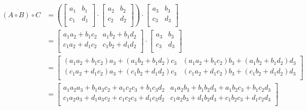 \documentclass[12pt]{article}
\begin{document}
\begin{align*}
    (A \circ B) \circ C &= 
        \left(
            \begin{bmatrix}
                a_1 & b_1 \\
                c_1 & d_1 \\               
            \end{bmatrix}
            \cdot
            \begin{bmatrix}
                a_2 & b_2 \\
                c_2 & d_2 \\
            \end{bmatrix}
        \right)
        \cdot
        \begin{bmatrix}
            a_3 & b_3 \\
            c_3 & d_3 \\
        \end{bmatrix}
        \\[1em]
        & =
        \begin{bmatrix}
            a_1a_2 + b_1c_2 & a_1b_2 + b_1d_2 \\ 
            c_1a_2 + d_1c_2 & c_1b_2 + d_1d_2 \\
        \end{bmatrix}
        \cdot
        \begin{bmatrix}
            a_3 & b_3 \\
            c_3 & d_3 \\
        \end{bmatrix}
        \\[1em]
        & = 
        \begin{bmatrix}
            (a_1a_2 + b_1c_2)a_3 + (a_1b_2 + b_1d_2)c_3 & (a_1a_2 + b_1c_2)b_3 + (a_1b_2 + b_1d_2)d_3 \\ 
            (c_1a_2 + d_1c_2)a_3 + (c_1b_2 + d_1d_2)c_3 & (c_1a_2 + d_1c_2)b_3 + (c_1b_2 + d_1d_2)d_3 \\ 
        \end{bmatrix}
        \\[1em]
        & = 
        \begin{bmatrix}
            a_1a_2a_3 + b_1a_3c_2 + a_1c_2c_3 + b_1c_3d_2 & a_1a_2b_3 + b_1b_2d_3 + a_1b_2c_3 + b_1c_2d_3 \\ 
            c_1a_2a_3 + d_1a_3c_2 + c_1c_2c_3 + d_1c_3d_2 & c_1a_2b_3 + d_1b_2d_3 + c_1b_2c_3 + d_1c_2d_3 \\
        \end{bmatrix}
\end{align*}
\end{document}
